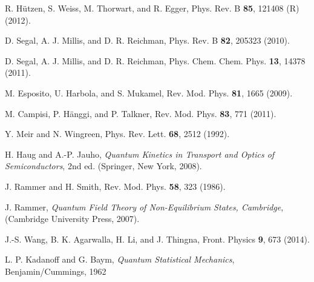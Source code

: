 \documentclass[aps,pra,twocolumn,groupedaddress,showpacs,superscriptaddress,amssymb,amsmath]{revtex4-1}
\begin{document}
\begin{thebibliography}{0}
R. H\"utzen, S. Weiss, M. Thorwart, and R. Egger,
Phys. Rev. B {\bf 85}, 121408 (R) (2012).

D. Segal, A. J. Millis, and D. R. Reichman,
Phys. Rev. B {\bf 82}, 205323 (2010).

D. Segal, A. J. Millis, and D. R. Reichman,
Phys. Chem. Chem. Phys. {\bf 13}, 14378 (2011).


 M. Esposito, U. Harbola, and S. Mukamel, 
Rev. Mod. Phys. {\bf 81}, 1665 (2009).

M. Campisi, P. H\"anggi, and P. Talkner, 
Rev. Mod. Phys. {\bf 83}, 771 (2011).


 Y. Meir and N. Wingreen,
Phys. Rev. Lett. {\bf 68}, 2512 (1992).

H. Haug and A.-P. Jauho,
{\it Quantum Kinetics in Transport and Optics of Semiconductors}, 2nd ed. (Springer, New York, 2008).


J. Rammer and H. Smith, Rev. Mod. Phys. {\bf 58}, 323 (1986).

 J. Rammer, {\it Quantum Field Theory of Non-Equilibrium
States, Cambridge}, (Cambridge University Press, 2007).

J.-S. Wang, B. K. Agarwalla, H. Li,
and J. Thingna, Front. Physics {\bf 9}, 673 (2014).





 L. P. Kadanoff and G. Baym, {\it Quantum Statistical Mechanics}, Benjamin/Cummings, 1962


\end{thebibliography}
\end{document}
